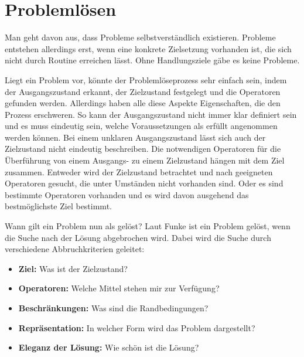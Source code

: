 
\section{Problemlösen}
Man geht davon aus, dass Probleme selbstverständlich existieren. Probleme entstehen allerdings erst, wenn eine konkrete Zielsetzung vorhanden ist, die sich nicht durch Routine erreichen lässt. Ohne Handlungsziele gäbe es keine Probleme. \cite{Funke2015, Betsch2011,  Dorner1984}

Liegt ein Problem vor, könnte der Problemlöseprozess sehr einfach sein, indem der Ausgangszustand erkannt, der Zielzustand festgelegt und die Operatoren gefunden werden. Allerdings haben alle diese Aspekte Eigenschaften, die den Prozess erschweren. So kann der Ausgangszustand nicht immer klar definiert sein und es muss eindeutig sein, welche Voraussetzungen als erfüllt angenommen werden können. Bei einem unklaren Ausgangszustand lässt sich auch der Zielzustand nicht eindeutig beschreiben. Die notwendigen Operatoren für die Überführung von einem Ausgangs- zu einem Zielzustand hängen mit dem Ziel zusammen. Entweder wird der Zielzustand betrachtet und nach geeigneten Operatoren gesucht, die unter Umständen nicht vorhanden sind. Oder es sind bestimmte Operatoren vorhanden und es wird davon ausgehend das bestmöglichste Ziel bestimmt. \cite{Funke2015}

Wann gilt ein Problem nun als gelöst? Laut Funke \cite{Funke2015} ist ein Problem gelöst, wenn die Suche nach der Lösung abgebrochen wird. Dabei wird die Suche durch verschiedene Abbruchkriterien geleitet:
\begin{itemize}
\item \textbf{Ziel:} Was ist der Zielzustand?
\item \textbf{Operatoren:} Welche Mittel stehen mir zur Verfügung?
\item \textbf{Beschränkungen:} Was sind die Randbedingungen?
\item \textbf{Repräsentation:} In welcher Form wird das Problem dargestellt?
\item \textbf{Eleganz der Lösung:} Wie schön ist die Lösung?
\end{itemize}

